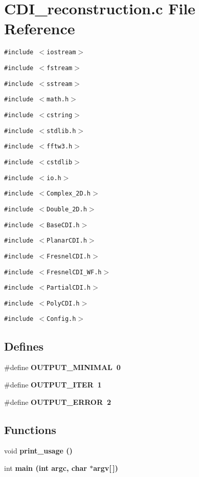 \section{CDI\_\-reconstruction.c File Reference}
\label{CDI__reconstruction_8c}
{\tt \#include $<$iostream$>$}\par
{\tt \#include $<$fstream$>$}\par
{\tt \#include $<$sstream$>$}\par
{\tt \#include $<$math.h$>$}\par
{\tt \#include $<$cstring$>$}\par
{\tt \#include $<$stdlib.h$>$}\par
{\tt \#include $<$fftw3.h$>$}\par
{\tt \#include $<$cstdlib$>$}\par
{\tt \#include $<$io.h$>$}\par
{\tt \#include $<$Complex\_\-2D.h$>$}\par
{\tt \#include $<$Double\_\-2D.h$>$}\par
{\tt \#include $<$Base\-CDI.h$>$}\par
{\tt \#include $<$Planar\-CDI.h$>$}\par
{\tt \#include $<$Fresnel\-CDI.h$>$}\par
{\tt \#include $<$Fresnel\-CDI\_\-WF.h$>$}\par
{\tt \#include $<$Partial\-CDI.h$>$}\par
{\tt \#include $<$Poly\-CDI.h$>$}\par
{\tt \#include $<$Config.h$>$}\par
\subsection*{Defines}
\begin{CompactItemize}
\item 
\#define \bf{OUTPUT\_\-MINIMAL}~0\label{CDI__reconstruction_8c_8ea18ab1b2e4de8e2d87eb43f87df319}

\item 
\#define \bf{OUTPUT\_\-ITER}~1\label{CDI__reconstruction_8c_5498ecc4b09810cda4c215d65c01926c}

\item 
\#define \bf{OUTPUT\_\-ERROR}~2\label{CDI__reconstruction_8c_35424d5bbd0726b8dc0395732aaf38eb}

\end{CompactItemize}
\subsection*{Functions}
\begin{CompactItemize}
\item 
void \bf{print\_\-usage} ()\label{CDI__reconstruction_8c_1f3584ed6af78d8b74199544ff9e1096}

\item 
int \bf{main} (int argc, char $\ast$argv[$\,$])
\end{CompactItemize}

